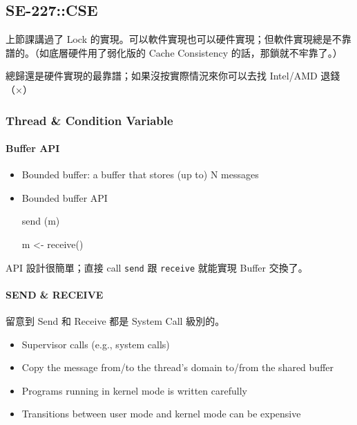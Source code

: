 \documentclass[
]{article}
\begin{document}
\hypertarget{header-n116}{%
\subsection{SE-227::CSE}\label{header-n116}}

上節課講過了 Lock
的實現。可以軟件實現也可以硬件實現；但軟件實現總是不靠譜的。（如底層硬件用了弱化版的
Cache Consistency 的話，那鎖就不牢靠了。）

總歸還是硬件實現的最靠譜；如果沒按實際情況來你可以去找 Intel/AMD
退錢（×）

\hypertarget{header-n119}{%
\subsubsection{Thread \& Condition Variable}\label{header-n119}}

\hypertarget{header-n120}{%
\paragraph{Buffer API}\label{header-n120}}

\begin{itemize}
\item
  Bounded buffer: a buffer that stores (up to) N messages
\item
  Bounded buffer API

  send (m)

  m \textless- receive()
\end{itemize}

API 設計很簡單；直接 call \texttt{send} 跟 \texttt{receive} 就能實現
Buffer 交換了。

\hypertarget{header-n129}{%
\paragraph{SEND \& RECEIVE}\label{header-n129}}

留意到 Send 和 Receive 都是 System Call 級別的。

\begin{itemize}
\item
  Supervisor calls (e.g., system calls)
\item
  Copy the message from/to the thread's domain to/from the shared buffer
\item
  Programs running in kernel mode is written carefully
\item
  Transitions between user mode and kernel mode can be expensive
\end{itemize}
\end{document}
